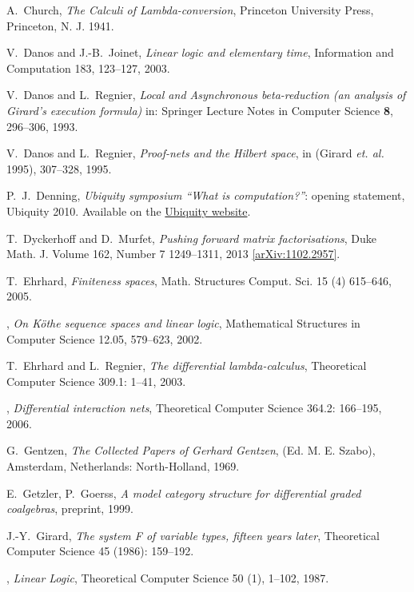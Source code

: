 \documentclass[english,letter paper,12pt,reqno]{article}
\theoremstyle{example}
\numberwithin{equation}{section}
\begin{document}
\begin{thebibliography}{BHLS03}
A.~Church, \textsl{The {C}alculi of {L}ambda-conversion}, Princeton University Press, Princeton, N. J. 1941.

V.~Danos and J.-B.~Joinet, \textsl{Linear logic and elementary time}, Information and Computation 183, 123--127, 2003.

V.~Danos and L.~Regnier, \textsl{Local and {A}synchronous beta-reduction (an analysis of {G}irard's execution formula)} in: Springer Lecture Notes in Computer Science \textbf{8}, 296--306, 1993.

V.~Danos and L.~Regnier, \textsl{Proof-nets and the Hilbert space}, in (Girard \textsl{et. al.} 1995), 307--328, 1995.

P.~J.~Denning, \textsl{Ubiquity symposium ``What is computation?''}: opening statement, Ubiquity 2010. Available on the \href{http://ubiquity.acm.org/article.cfm?id=1870596}{Ubiquity website}.

T.~Dyckerhoff and D.~Murfet, \textsl{Pushing forward matrix factorisations}, Duke Math. J. Volume 162, Number 7 1249--1311, 2013 \href{http://arxiv.org/abs/1102.2957}{[arXiv:1102.2957]}.

T.~Ehrhard, \textsl{Finiteness spaces}, Math. Structures Comput. Sci. 15 (4) 615--646, 2005.

\bysame, \textsl{On {K}\"othe sequence spaces and linear logic}, Mathematical Structures in Computer Science 12.05, 579--623, 2002.

T.~Ehrhard and L.~Regnier, \textsl{The differential lambda-calculus}, Theoretical Computer Science 309.1: 1--41, 2003.

\bysame, \textsl{Differential interaction nets}, Theoretical Computer Science 364.2: 166--195, 2006.

G.~Gentzen, \textsl{The Collected Papers of Gerhard Gentzen}, (Ed. M. E. Szabo), Amsterdam, Netherlands: North-Holland, 1969.

E.~Getzler, P.~Goerss, \emph{A model category structure for differential graded coalgebras}, preprint, 1999.
  
J.-Y.~Girard, \textsl{The system F of variable types, fifteen years later}, Theoretical Computer Science 45 (1986): 159--192.
  
\bysame, \textsl{Linear Logic}, Theoretical Computer Science 50 (1), 1--102, 1987.


\end{thebibliography}
\end{document}
